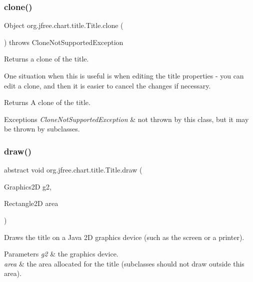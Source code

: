 \subsubsection{\texorpdfstring{clone()}{clone()}}
{\footnotesize\ttfamily Object org.\+jfree.\+chart.\+title.\+Title.\+clone (\begin{DoxyParamCaption}{ }\end{DoxyParamCaption}) throws Clone\+Not\+Supported\+Exception}

Returns a clone of the title. 

One situation when this is useful is when editing the title properties -\/ you can edit a clone, and then it is easier to cancel the changes if necessary.

\begin{DoxyReturn}{Returns}
A clone of the title.
\end{DoxyReturn}

\begin{DoxyExceptions}{Exceptions}
{\em Clone\+Not\+Supported\+Exception} & not thrown by this class, but it may be thrown by subclasses. \\
\hline
\end{DoxyExceptions}
\mbox{\label{classorg_1_1jfree_1_1chart_1_1title_1_1_title_a5b3e2e024b18d76ef0ba18a03a7ce11c}} 
\subsubsection{\texorpdfstring{draw()}{draw()}}
{\footnotesize\ttfamily abstract void org.\+jfree.\+chart.\+title.\+Title.\+draw (\begin{DoxyParamCaption}\item[{Graphics2D}]{g2,  }\item[{Rectangle2D}]{area }\end{DoxyParamCaption})\hspace{0.3cm}{\ttfamily [abstract]}}

Draws the title on a Java 2D graphics device (such as the screen or a printer).


\begin{DoxyParams}{Parameters}
{\em g2} & the graphics device. \\
\hline
{\em area} & the area allocated for the title (subclasses should not draw outside this area). \\
\hline
\end{DoxyParams}
\mbox{\label{classorg_1_1jfree_1_1chart_1_1title_1_1_title_a816cb57f8f1cbf9115a54c7b1cfea2ed}} 

